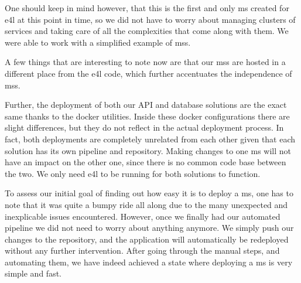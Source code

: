 One should keep in mind however, that this is the first and only
\gls{ms} created for \gls{e4l} at this point in time, so we did not
have to worry about managing clusters of services and taking care of
all the complexities that come along with them. We were able to work
with a simplified example of \glspl{ms}.


A few things that are interesting to note now are that our \glspl{ms}
are hosted in a different place from the \gls{e4l} code, which further
accentuates the independence of \glspl{ms}.

Further, the deployment of both our API and database solutions are the
exact same thanks to the docker utilities. Inside these docker
configurations there are slight differences, but they do not reflect
in the actual deployment process. In fact, both deployments are
completely unrelated from each other given that each solution has its
own pipeline and repository. Making changes to one \gls{ms} will not
have an impact on the other one, since there is no common code base
between the two. We only need \gls{e4l} to be running for both
solutions to function.


To assess our initial goal of finding out how easy it is to deploy a
\gls{ms}, one has to note that it was quite a bumpy ride all along due
to the many unexpected and inexplicable issues encountered. However,
once we finally had our automated pipeline we did not need to worry
about anything anymore. We simply push our changes to the repository,
and the application will automatically be redeployed without any
further intervention. After going through the manual steps, and
automating them, we have indeed achieved a state where deploying a
\gls{ms} is very simple and fast.
